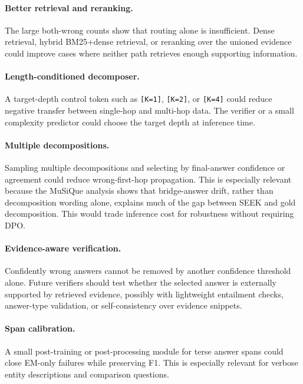 \documentclass{nthu_thesis}
\begin{document}
\begin{thesiscjk}
\paragraph{Better retrieval and reranking.} The large both-wrong counts show that routing alone is insufficient. Dense retrieval, hybrid BM25+dense retrieval, or reranking over the unioned evidence could improve cases where neither path retrieves enough supporting information.

\paragraph{Length-conditioned decomposer.} A target-depth control token such as \texttt{[K=1]}, \texttt{[K=2]}, or \texttt{[K=4]} could reduce negative transfer between single-hop and multi-hop data. The verifier or a small complexity predictor could choose the target depth at inference time.

\paragraph{Multiple decompositions.} Sampling multiple decompositions and selecting by final-answer confidence or agreement could reduce wrong-first-hop propagation. This is especially relevant because the MuSiQue analysis shows that bridge-answer drift, rather than decomposition wording alone, explains much of the gap between SEEK and gold decomposition. This would trade inference cost for robustness without requiring DPO.

\paragraph{Evidence-aware verification.} Confidently wrong answers cannot be removed by another confidence threshold alone. Future verifiers should test whether the selected answer is externally supported by retrieved evidence, possibly with lightweight entailment checks, answer-type validation, or self-consistency over evidence snippets.

\paragraph{Span calibration.} A small post-training or post-processing module for terse answer spans could close EM-only failures while preserving F1. This is especially relevant for verbose entity descriptions and comparison questions.




\end{thesiscjk}
\end{document}
